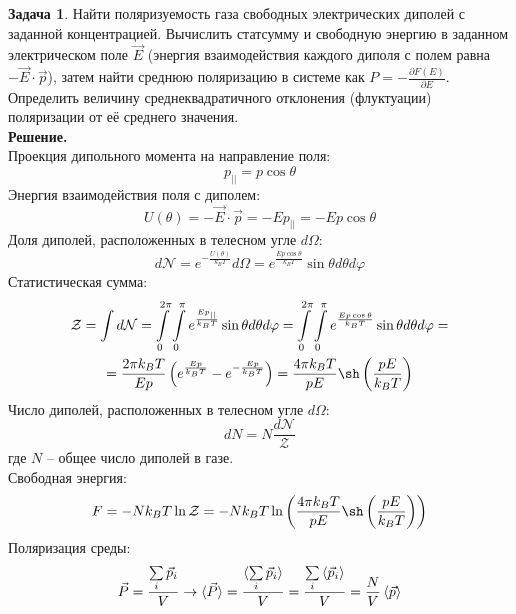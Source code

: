 \documentclass[12pt]{article}
\theoremstyle{definition}
\newtheorem{zad}{Задача}[section]
\begin{document}
\begin{zad}
Найти поляризуемость газа свободных электрических диполей с заданной концентрацией. Вычислить статсумму и свободную энергию в заданном электрическом поле $\vec{E}$ (энергия взаимодействия каждого диполя с полем равна $-\Vec{E}\cdot\Vec{p}$), затем найти среднюю поляризацию в системе как $P=-\frac{\partial F(E)}{\partial E}$. Определить величину среднеквадратичного отклонения (флуктуации) поляризации от её среднего значения.\\
\textbf{Решение.}\\
Проекция дипольного момента на направление поля: 
\begin{equation}
    p_{||}=p\cos\theta
\end{equation}
Энергия взаимодействия поля с диполем:
\begin{equation}
    U(\theta)=-\vec{E}\cdot\vec{p}=-Ep_{||}=-Ep\cos\theta
\end{equation}
Доля диполей, расположенных в телесном угле $d\Omega$:
\begin{equation}
    d\mathcal{N}=e^{-\frac{U(\theta)}{k_BT}}d\Omega=e^\frac{Ep\cos\theta}{k_BT}\sin\theta d\theta d\varphi
\end{equation}
Статистическая сумма:
\begin{multline}
    \mathcal{Z}=\int d\mathcal{N}=\int\limits_0^{2\pi}\int\limits_0^\pi e^{\frac{Ep_{||}}{k_BT}}\sin\theta d\theta d\varphi=\int\limits_0^{2\pi}\int\limits_0^\pi e^\frac{Ep\cos\theta}{k_BT}\sin\theta d\theta d\varphi=\\=\frac{2\pi k_BT}{Ep}\left(e^\frac{Ep}{k_BT}-e^{-\frac{Ep}{k_BT}}\right)=\frac{4\pi k_BT}{pE}\sh\left(\frac{pE}{k_BT}\right)
\end{multline}
Число диполей, расположенных в телесном угле $d\Omega$:
\begin{equation}
    dN=N\frac{d\mathcal{N}}{\mathcal{Z}}
\end{equation}
где $N$ -- общее число диполей в газе.\\
Свободная энергия:
\begin{equation}\label{eq4}
    F=-Nk_BT\ln\mathcal{Z}=-Nk_BT\ln\left(\frac{4\pi k_BT}{pE}\sh\left(\frac{pE}{k_BT}\right)\right)
\end{equation}
Поляризация среды:
\begin{equation}
    \vec{P}=\frac{\sum\limits_i\vec{p}_i}{V}\rightarrow\braket{\vec{P}}=\frac{\braket{\sum\limits_i\vec{p}_i}}{V}=\frac{\sum\limits_i\braket{\vec{p}_i}}{V}=\frac{N}{V}\braket{\vec{p}}
\end{equation}

\end{zad}
\end{document}
